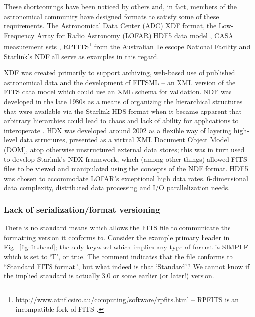 \documentclass[final,authoryear,5p,times,twocolumn]{elsarticle}
\begin{document}
{{These shortcomings have been noticed by others and, in fact, members
of the astronomical community have designed formats to satisfy some
of these requirements. The Astronomical Data Center (ADC) XDF
format, the Low-Frequency Array for Radio Astronomy (LOFAR) HDF5 data
model \citep{2012ASPC..461..283A}, CASA measurement sets
\citep{2012ASPC..461..849P},
RPFITS\footnote{\url{http://www.atnf.csiro.au/computing/software/rpfits.html}
-- RPFITS is an incompatible fork of FITS \citep[see e.g.][]{1998ASPC..145...32B}.} from the Australian Telescope
National Facility
and Starlink's NDF
\citep{1988STARB...2...11C,1993ASPC...52..229W,P91_adassxxiii} all
serve as examples in this regard.

XDF \citep{2001ASPC..238..217S} was created primarily to support archiving, web-based use of
published astronomical data and the development of FITSML -- an XML version
of the FITS data model which could use an XML schema for validation.
NDF was developed in the late
1980s as a means of organizing the hierarchical structures that were
available via the Starlink HDS format when it became apparent that
arbitrary hierarchies could lead to chaos and lack of ability for
applications to interoperate \citep{2014Jenness}.
HDX \citep{2003ASPC..295..221G} was developed around 2002 as a flexible
way of layering high-level data structures, presented as a virtual XML
Document Object Model (DOM), atop otherwise unstructured external data stores; this was in
turn used to develop Starlink's NDX framework, which (among other
things) allowed FITS files to be viewed and manipulated using the
concepts of the NDF format.
HDF5 \citep{2012ASPC..461..283A} was chosen to accommodate LOFAR's
exceptional high data rates, 6-dimensional data complexity, distributed
data processing and I/O parallelization needs.


\subsubsection{Lack of serialization/format versioning}
\label{lack_of_serialization}


There is no standard means which allows the FITS file to
communicate the formatting version it conforms to.  Consider the example primary header
in Fig.~\ref{fig:fitshead}; the only keyword which implies any type of
format is SIMPLE which is set to `T', or true. The comment indicates that
the file conforms to ``Standard FITS format'', but what indeed is that `Standard'?
We cannot know if the implied standard is actually 3.0 or some earlier (or later!)
version.


}}
\end{document}
